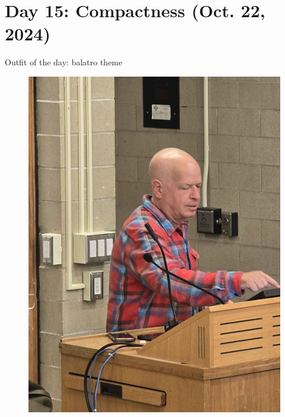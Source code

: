 \section{Day 15: Compactness (Oct. 22, 2024)}
Outfit of the day: balatro theme
\begin{figure}[h]
    \centering
    \includegraphics[scale=0.1]{MAT327 Notes/Dror Shirts/dror day 15 shirt.jpg}
\end{figure}

